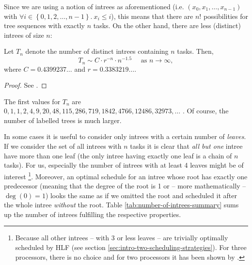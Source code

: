 
Since we are using a notion of intrees as aforementioned (i.e. $(x_0,x_1,\dots,x_{n-1})$ with $\forall i \in \left\{0,1,2,\dots,n-1 \right\}.\ x_i \leq i$), this means that there are $n!$ possibilities for tree sequences with exactly $n$ tasks. On the other hand, there are less (distinct) intrees of size $n$:

\begin{theorem}
  Let $T_n$ denote the number of distinct intrees containing $n$ tasks. Then,
  \begin{equation*}
    T_n \sim C\cdot r^{-n}\cdot n^{-1.5} 
    \quad \text{ as } n\rightarrow \infty,
  \end{equation*}
  where $C=0.4399237\dots$ and $r=0.3383219\dots$.
\end{theorem}

\begin{proof}
  See \cite{asymptotic_enum_odlyzko}.
\end{proof}

The first values for $T_n$ are $0, 1, 1, 2, 4, 9, 20, 48, 115, 286, 719, 1842, 4766, 12486, 32973, \dots$ \cite{oeisrootedtrees}. Of course, the number of labelled trees is much larger.

In some cases it is useful to consider only intrees with a certain number of \emph{leaves}. If we consider the set of all intrees with $n$ tasks it is clear that \emph{all but one} intree have more than one leaf (the only intree having exactly one leaf is a chain of $n$ tasks). For us, especially the number of intrees with at least 4 leaves might be of interest \footnote{Because all other intrees -- with 3 or less leaves -- are trivially optimally scheduled by HLF (see section \ref{sec:intro-two-scheduling-strategies}). For three processors, there is no choice and for two processors it has been shown by \cite{chandyreynoldsshortpaper1975}.}. Moreover, an optimal schedule for an intree whose root has exactly one predecessor (meaning that the degree of the root is 1 or -- more mathematically -- $\deg (0) = 1$) looks the same as if we omitted the root and scheduled it after the whole intree \emph{without} the root. Table \ref{tab:number-of-intrees-summary} sums up the number of intrees fulfilling the respective properties.

